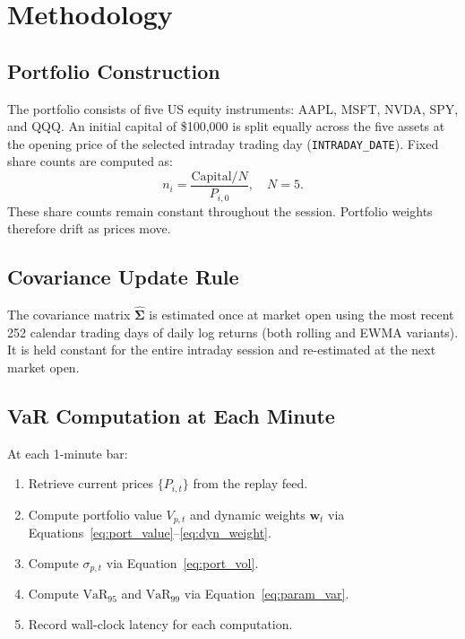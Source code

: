 \documentclass[12pt, a4paper]{article}
\newcommand{\VaR}{\mathrm{VaR}}
\begin{document}
\section{Methodology}
\label{sec:methodology}

\subsection{Portfolio Construction}

The portfolio consists of five US equity instruments:
AAPL, MSFT, NVDA, SPY, and QQQ.
An initial capital of \$100{,}000 is split equally across the five assets
at the opening price of the selected intraday trading day (\texttt{INTRADAY\_DATE}).
Fixed share counts are computed as:
\begin{equation}
  n_i = \frac{\text{Capital} / N}{P_{i,0}}, \quad N = 5.
  \label{eq:shares}
\end{equation}
These share counts remain constant throughout the session.  Portfolio
weights therefore drift as prices move.

\subsection{Covariance Update Rule}

The covariance matrix $\hat{\bm{\Sigma}}$ is estimated once at market open
using the most recent 252 calendar trading days of daily log returns
(both rolling and EWMA variants).  It is held constant for the entire
intraday session and re-estimated at the next market open.

\subsection{VaR Computation at Each Minute}

At each 1-minute bar:
\begin{enumerate}
  \item Retrieve current prices $\{P_{i,t}\}$ from the replay feed.
  \item Compute portfolio value $V_{p,t}$ and dynamic weights $\bm{w}_t$
        via Equations~\eqref{eq:port_value}--\eqref{eq:dyn_weight}.
  \item Compute $\sigma_{p,t}$ via Equation~\eqref{eq:port_vol}.
  \item Compute $\VaR_{95}$ and $\VaR_{99}$ via Equation~\eqref{eq:param_var}.
  \item Record wall-clock latency for each computation.
\end{enumerate}
\end{document}
